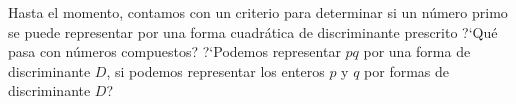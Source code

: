 \theoremstyle{plain}

\theoremstyle{definition}


Hasta el momento, contamos con un criterio para determinar si un
n\'umero primo se puede representar por una forma cuadr\'atica
de discriminante prescrito %
?`Qu\'e pasa con n\'umeros compuestos?
?`Podemos representar $pq$ por una forma de discriminante $D$,
si podemos representar los enteros $p$ y $q$ por formas de discriminante $D$?
